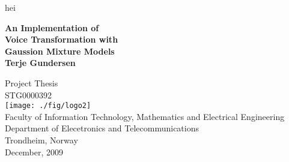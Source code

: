 \begin{titlepage}
 
\begin{center}
 
\color{white} hei\\[1cm]
\color{black}

{ \huge \textbf{An Implementation of \\[0.2cm] Voice Transformation with \\[0.5cm] Gaussion Mixture Models}}\\[4cm]


 
{\LARGE \bf Terje Gundersen}
 
\vfill

\large Project Thesis \\ STG0000392\\[2cm]

\texttt{[image: ./fig/logo2]}\\[0.5cm]
 



\large Faculty of Information Technology, Mathematics and Electrical Engineering \\
Department of Elecetronics and Telecommunications\\
Trondheim, Norway\\[0.5cm]


December, 2009
 
\end{center}
 
\end{titlepage}
